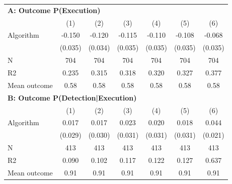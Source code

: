 \begin{tabular}{lcccccc} \toprule
\multicolumn{7}{l}{\textbf{A: Outcome P(Execution)}} \\ \multicolumn{1}{l}{} & (1) & (2) & (3) & (4) & (5) & (6) \\ \midrule
Algorithm   &      -0.150\sym{***}&      -0.120\sym{***}&      -0.115\sym{***}&      -0.110\sym{***}&      -0.108\sym{***}&      -0.068\sym{**} \\
            &     (0.035)         &     (0.034)         &     (0.035)         &     (0.035)         &     (0.035)         &     (0.035)         \\
\midrule
N           &         704         &         704         &         704         &         704         &         704         &         704         \\
R2          &       0.235         &       0.315         &       0.318         &       0.320         &       0.327         &       0.377         \\
Mean outcome&        0.58         &        0.58         &        0.58         &        0.58         &        0.58         &        0.58         \\

\midrule \multicolumn{7}{l}{\textbf{B: Outcome P(Detection|Execution)}} \\ \multicolumn{1}{l}{} & (1) & (2) & (3) & (4) & (5) & (6) \\ \midrule
Algorithm   &       0.017         &       0.017         &       0.023         &       0.020         &       0.018         &       0.044\sym{**} \\
            &     (0.029)         &     (0.030)         &     (0.031)         &     (0.031)         &     (0.031)         &     (0.021)         \\
\midrule
N           &         413         &         413         &         413         &         413         &         413         &         413         \\
R2          &       0.090         &       0.102         &       0.117         &       0.122         &       0.127         &       0.637         \\
Mean outcome&        0.91         &        0.91         &        0.91         &        0.91         &        0.91         &        0.91         \\


\end{tabular}
